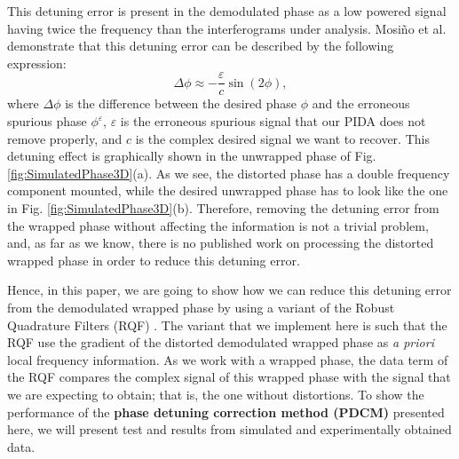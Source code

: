 This detuning error is present in the demodulated phase as a low powered 
signal having twice the frequency than the interferograms under analysis.
Mosi\~no et al. \cite{Mosinio} demonstrate that this detuning error can be 
described by the following expression: 
\begin{equation}\label{Eq:DetuningError}
	\Delta \phi \approx - \frac{\varepsilon}{c} \sin(2\phi),
\end{equation}
where $\Delta \phi$ is the difference between the desired phase $\phi$ and the 
erroneous spurious phase $\phi^\varepsilon$, $\varepsilon$ is the erroneous 
spurious signal that our PIDA does not remove properly, and $c$ is the complex 
desired signal we want to recover. This detuning effect is graphically shown in 
the unwrapped phase of Fig. \ref{fig:SimulatedPhase3D}(a). As we see, the 
distorted phase has a double frequency component mounted, while the desired 
unwrapped phase has to look like the one in Fig. \ref{fig:SimulatedPhase3D}(b). 
Therefore, removing the detuning error from the wrapped phase without affecting 
the information is not a trivial problem, and, as far as we know, there is no 
published work on processing the distorted wrapped phase in order to reduce 
this detuning error.

Hence, in this paper, we are going to show how we can reduce this detuning 
error from the demodulated wrapped phase by using a variant of the Robust 
Quadrature Filters (RQF) \cite{RQF}. The variant that we implement here is 
such that the RQF use the gradient of the distorted demodulated wrapped 
phase as \emph{a priori} local frequency information. As we work with a 
wrapped phase, the data term of the RQF compares the complex signal of 
this wrapped phase with the signal that we are expecting to obtain; that is, 
the one without distortions.
To show the performance of the \textbf{phase detuning correction method (PDCM)}
presented here, we will present test and results from simulated and 
experimentally obtained data.

